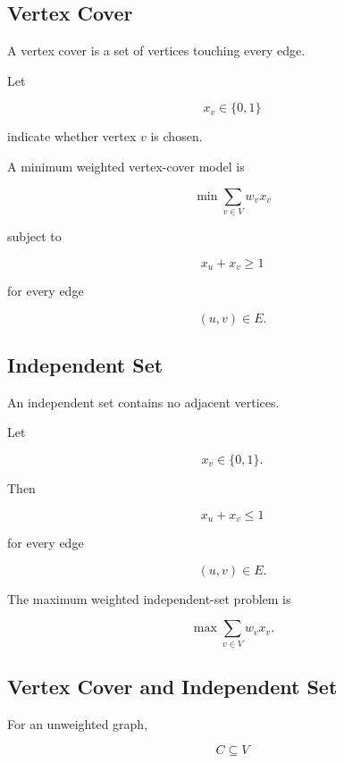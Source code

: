 \subsection{Vertex Cover}
\label{subsec:vertex-cover}

A vertex cover is a set of vertices touching every edge.

Let

\[
x_v\in\{0,1\}
\]

indicate whether vertex \(v\) is chosen.

A minimum weighted vertex-cover model is

\[
\boxed{
\min
\sum_{v\in V}
w_vx_v
}
\]

subject to

\[
\boxed{
x_u+x_v\geq1
}
\]

for every edge

\[
(u,v)\in E.
\]

\subsection{Independent Set}
\label{subsec:independent-set-optimization}

An independent set contains no adjacent vertices.

Let

\[
x_v\in\{0,1\}.
\]

Then

\[
\boxed{
x_u+x_v\leq1
}
\]

for every edge

\[
(u,v)\in E.
\]

The maximum weighted independent-set problem is

\[
\boxed{
\max
\sum_{v\in V}
w_vx_v.
}
\]

\subsection{Vertex Cover and Independent Set}
\label{subsec:vertex-cover-independent-set}

For an unweighted graph,

\[
C
\subseteq V
\]

